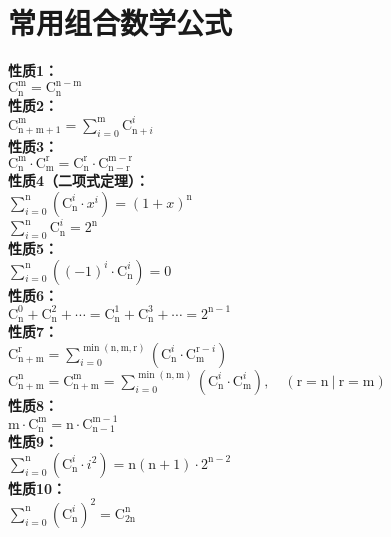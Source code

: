 \section{常用组合数学公式}
\textbf{性质1：}\\[8pt]
{\large $\mathrm{C}_{\mathrm{n}}^{\mathrm{m}} = \mathrm{C}_{\mathrm{n}}^{\mathrm{n} - \mathrm{m}}$}\\[12pt]
\textbf{性质2：}\\[8pt]
{\large $\mathrm{C}_{\mathrm{n} + \mathrm{m} + 1}^{\mathrm{m}} = \sum_{i = 0}^{\mathrm{m}} \mathrm{C}_{\mathrm{n} + i}^{i}$}\\[12pt]
\textbf{性质3：}\\[8pt]
{\large $\mathrm{C}_{\mathrm{n}}^{\mathrm{m}} \cdot \mathrm{C}_{\mathrm{m}}^{\mathrm{r}} = \mathrm{C}_{\mathrm{n}}^{\mathrm{r}} \cdot \mathrm{C}_{\mathrm{n} - \mathrm{r}}^{\mathrm{m} - \mathrm{r}}$}\\[12pt]
\textbf{性质4（二项式定理）：}\\[8pt]
{\large $\sum_{i = 0}^{\mathrm{n}} \left( \mathrm{C}_{\mathrm{n}}^{i} \cdot x^{i} \right) = (1 + x)^{\mathrm{n}}$}\\[12pt]
{\large $\sum_{i = 0}^{\mathrm{n}} \mathrm{C}_{\mathrm{n}}^{i} = 2^{\mathrm{n}}$}\\[12pt]
\textbf{性质5：}\\[8pt]
{\large $\sum_{i = 0}^{\mathrm{n}} \left( (-1)^{i} \cdot \mathrm{C}_{\mathrm{n}}^{i} \right) = 0$}\\[12pt]
\textbf{性质6：}\\[8pt]
{\large $\mathrm{C}_{\mathrm{n}}^{0} + \mathrm{C}_{\mathrm{n}}^{2} + \cdots = \mathrm{C}_{\mathrm{n}}^{1} + \mathrm{C}_{\mathrm{n}}^{3} + \cdots = 2^{\mathrm{n} - 1}$}\\[12pt]
\textbf{性质7：}\\[8pt]
{\large $\mathrm{C}_{\mathrm{n} + \mathrm{m}}^{\mathrm{r}} = \sum_{i = 0}^{\min(\mathrm{n}, \mathrm{m}, \mathrm{r})} \left( \mathrm{C}_{\mathrm{n}}^{i} \cdot \mathrm{C}_{\mathrm{m}}^{\mathrm{r} - i} \right)$}\\[12pt]
{\large $\mathrm{C}_{\mathrm{n} + \mathrm{m}}^{\mathrm{n}} = \mathrm{C}_{\mathrm{n} + \mathrm{m}}^{\mathrm{m}} = \sum_{i = 0}^{\min(\mathrm{n}, \mathrm{m})} \left( \mathrm{C}_{\mathrm{n}}^{i} \cdot \mathrm{C}_{\mathrm{m}}^{i} \right), \quad (\mathrm{r} = \mathrm{n}\ |\ \mathrm{r} = \mathrm{m})$}\\[12pt]
\textbf{性质8：}\\[8pt]
{\large $\mathrm{m} \cdot \mathrm{C}_{\mathrm{n}}^{\mathrm{m}} = \mathrm{n} \cdot \mathrm{C}_{\mathrm{n} - 1}^{\mathrm{m} - 1}$}\\[12pt]
\textbf{性质9：}\\[8pt]
{\large $\sum_{i = 0}^{\mathrm{n}} \left( \mathrm{C}_{\mathrm{n}}^{i} \cdot i^2 \right) = \mathrm{n}(\mathrm{n} + 1) \cdot 2^{\mathrm{n} - 2}$}\\[12pt]
\textbf{性质10：}\\[8pt]
{\large $\sum_{i = 0}^{\mathrm{n}} \left( \mathrm{C}_{\mathrm{n}}^{i} \right)^2 = \mathrm{C}_{2\mathrm{n}}^{\mathrm{n}}$}\\[12pt]


